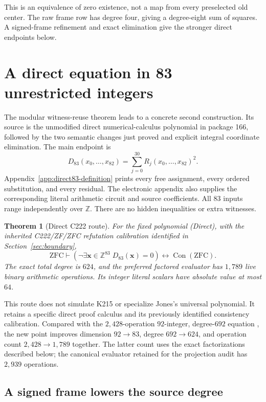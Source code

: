 \documentclass[11pt]{article}
\newtheorem{theorem}{Theorem}[section]
\theoremstyle{remark}
\newcommand{\Z}{\mathbb Z}
\newcommand{\Con}{\operatorname{Con}}
\newcommand{\ZFC}{\mathrm{ZFC}}
\begin{document}
This is an equivalence of zero existence, not a map from every preselected
old center. The raw frame row has degree four, giving a degree-eight
sum of squares. A signed-frame refinement and exact elimination give
the stronger direct endpoints below.


\section{A direct equation in 83 unrestricted integers}\label{sec:direct-results}

The modular witness-reuse theorem leads to a concrete second construction.
Its source is the unmodified direct numerical-calculus polynomial in
package 166, followed by the two semantic changes just proved and explicit
integral coordinate elimination. The main endpoint is
\[
 D_{83}(x_0,\ldots,x_{82})
       =\sum_{j=0}^{30}R_j(x_0,\ldots,x_{82})^2.
 \tag{Direct}
\]
Appendix~\ref{app:direct83-definition} prints every free assignment, every
ordered substitution, and every residual. The electronic appendix also
supplies the corresponding literal arithmetic circuit and source coefficients.
All \(83\) inputs range independently over \(\Z\).
There are no hidden inequalities or extra witnesses.

\begin{theorem}[Direct C222 route]\label{thm:direct}
For the fixed polynomial (Direct), with the inherited C222/ZF/ZFC
refutation calibration identified in Section~\ref{sec:boundary},
\[
 \ZFC\vdash
 \left(\neg\exists\boldsymbol x\in\Z^{83}\;D_{83}(\boldsymbol x)=0\right)
       \longleftrightarrow\Con(\ZFC).
\]
The exact total degree is \(624\), and the preferred factored evaluator has
\(1{,}789\) live binary arithmetic operations. Its integer literal scalars
have absolute value at most \(64\).
\end{theorem}

This route does not simulate K215 or specialize Jones's universal
polynomial. It retains a specific direct proof calculus and its previously
identified consistency calibration. Compared with the \(2{,}428\)-operation \(92\)-integer, degree-\(692\) equation
\cite{source175}, the new point improves dimension \(92\to83\), degree
\(692\to624\), and operation count \(2{,}428\to1{,}789\) together.
The latter count uses the exact factorizations described below; the
canonical evaluator retained for the projection audit has \(2{,}939\) operations.

\subsection{A signed frame lowers the source degree}
\end{document}
